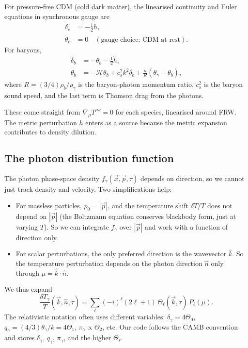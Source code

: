 For pressure-free CDM (cold dark matter), the linearised continuity and Euler equations in synchronous gauge are
\begin{align}
  \dot\delta_c &= -\tfrac{1}{2}\dot h, \label{eq:cont_c}\\
  \dot\theta_c &= 0\quad (\text{gauge choice: CDM at rest}). \label{eq:euler_c}
\end{align}
For baryons,
\begin{align}
  \dot\delta_b &= -\theta_b - \tfrac{1}{2}\dot h, \label{eq:cont_b}\\
  \dot\theta_b &= -\mathcal{H}\theta_b + c_s^2 k^2 \delta_b + \frac{\dot\kappa}{R}(\theta_\gamma - \theta_b), \label{eq:euler_b}
\end{align}
where $R = (3/4)\rho_b/\rho_\gamma$ is the baryon-photon momentum ratio, $c_s^2$ is the baryon sound speed, and the last term is Thomson drag from the photons.

These come straight from $\nabla_\mu T^{\mu\nu} = 0$ for each species, linearised around FRW. The metric perturbation $h$ enters as a source because the metric expansion contributes to density dilution.

\subsection{The photon distribution function}

The photon phase-space density $f_\gamma(\vec x, \vec p, \tau)$ depends on direction, so we cannot just track density and velocity. Two simplifications help:
\begin{itemize}
  \item For massless particles, $p_0 = |\vec p|$, and the temperature shift $\delta T/T$ does not depend on $|\vec p|$ (the Boltzmann equation conserves blackbody form, just at varying $T$). So we can integrate $f_\gamma$ over $|\vec p|$ and work with a function of direction only.
  \item For scalar perturbations, the only preferred direction is the wavevector $\hat k$. So the temperature perturbation depends on the photon direction $\hat n$ only through $\mu = \hat k \cdot \hat n$.
\end{itemize}
We thus expand
\[
  \frac{\delta T_\gamma}{T}(\vec k, \hat n, \tau) = \sum_\ell (-i)^\ell (2\ell + 1)\, \Theta_\ell(\vec k, \tau)\, P_\ell(\mu).
\]
The relativistic notation often uses different variables: $\delta_\gamma = 4\Theta_0$, $q_\gamma = (4/3)\theta_\gamma/k = 4\Theta_1$, $\pi_\gamma \propto \Theta_2$, etc. Our code follows the CAMB convention and stores $\delta_\gamma$, $q_\gamma$, $\pi_\gamma$, and the higher $\Theta_\ell$.

